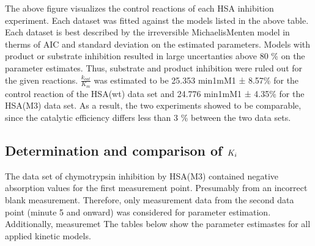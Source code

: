 \documentclass[letterpaper,10pt,english]{jupyterBook}
\begin{document}
\sphinxAtStartPar
{}

\sphinxAtStartPar
The above figure visualizes the control reactions of each HSA inhibition experiment. Each dataset was fitted against the models listed in the above table.
Each dataset is best described by the irreversible Michaelis\sphinxhyphen{}Menten model in therms of AIC and standard deviation on the estimated parameters. Models with product or substrate inhibition resulted in large uncertanties above 80 \% on the parameter estimates. Thus, substrate and product inhibition were ruled out for the given reactions.  \(\frac{k_{cat}}{K_{m}}\) was estimated to be 25.353 min\sphinxhyphen{}1mM\sphinxhyphen{}1 ± 8.57\%  for the control reaction of the HSA(wt) data set and 24.776 min\sphinxhyphen{}1mM\sphinxhyphen{}1 ± 4.35\% for the HSA(M3) data set. As a result, the two experiments showed to be comparable, since the catalytic efficiency differs less than 3 \% between the two data sets.


\subsection{Determination and comparison of \protect\(K_{i}\protect\)}
\label{\detokenize{scenarios/chymotrypsin_inhibition:determination-and-comparison-of-k-i}}
\sphinxAtStartPar
The data set of chymotrypsin inhibition by HSA(M3) contained negative absorption values for the first measurement point. Presumably from an incorrect blank measurement. Therefore, only measurement data from the second data point (minute 5 and onward) was considered for parameter estimation. Additionally, measuremet
The tables below show the parameter estimastes for all applied kinetic models.
\end{document}
